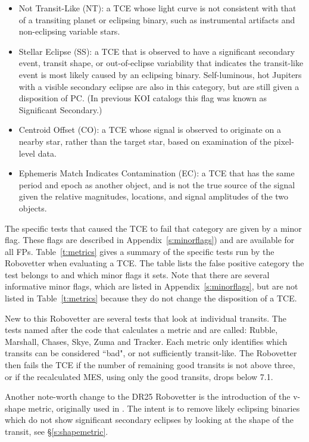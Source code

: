 \begin{itemize}
  \item Not Transit-Like (NT): a TCE whose light curve is not consistent with that of a transiting planet or eclipsing binary, such as instrumental artifacts and non-eclipsing variable stars.
  \item  Stellar Eclipse (SS): a TCE that is observed to have a significant secondary event, transit shape, or out-of-eclipse variability that indicates the transit-like event is most likely caused by an eclipsing binary. Self-luminous, hot Jupiters with a visible secondary eclipse are also in this category, but are still given a disposition of PC. (In previous KOI catalogs this flag was known as Significant Secondary.)
  \item Centroid Offset (CO): a TCE whose signal is observed to originate on a nearby star, rather than the target star, based on examination of the pixel-level data.
  \item Ephemeris Match Indicates Contamination (EC): a TCE that has the same period and epoch as another object, and is not the true source of the signal given the relative magnitudes, locations, and signal amplitudes of the two objects.
\end{itemize}

The specific tests that caused the TCE to fail that category are given by a minor flag. These flags are described in Appendix~\ref{s:minorflags}) and are available for all FPs.  Table~\ref{t:metrics} gives a summary of the specific tests run by the Robovetter when evaluating a TCE.  The table lists the false positive category the test belongs to and which minor flags it sets.  Note that there are several informative minor flags, which are listed in Appendix~\ref{s:minorflags}, but are not listed in Table~\ref{t:metrics} because they do not change the disposition of a TCE.

New to this Robovetter are several tests that look at individual transits. The tests named after the code that calculates a metric and are called: Rubble, Marshall, Chases, Skye, Zuma and Tracker.  Each metric only identifies which transits can be considered ``bad", or not sufficiently transit-like.  The Robovetter then fails the TCE if the number of remaining good transits is not above three, or if the recalculated MES, using only the good transits, drops below 7.1.

Another note-worth change to the DR25 Robovetter is the introduction of the v-shape metric, originally used in \citet{Batalha2013}.  The intent is to remove likely eclipsing binaries which do not show significant secondary eclipses by looking at the shape of the transit, see \S\ref{s:shapemetric}.

